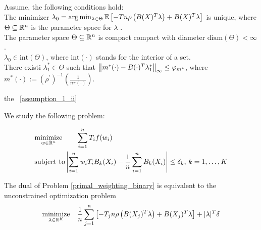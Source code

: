 \begin{asu}
  \label{assumption_1}
  Assume, the following conditions hold:
  \\
  \subasu 
  \label{assumption_1_i} 
  The minimizer 
  $
  \lambda_0 
  =
  \arg \min_{\lambda \in \Theta}
  \mathbb{E}
  \left[ 
    -T n 
    \rho 
    \left( 
    B(X)^T \lambda
    \right)
    +
    B(X)^T \lambda
  \right]
  $
  is unique,
  where 
  $\Theta \subseteq \mathbb{R}^n$ is the parameter space for $\lambda$
  .
  \\
  \subasu 
  \label{assumption_1_ii} 
  The parameter space 
  $\Theta \subseteq \mathbb{R}^n$
  is compact compact with diameter
  $\text{diam}(\Theta) < \infty$
  .
  \\
  \subasu 
  \label{assumption_1_iii}
  $\lambda_0 \in \text{int}(\Theta)$,
  where
  $\text{int}(\cdot)$
  stands for the interior of a set.
  \\
  \subasu
  \label{assumption_1_iv}
  There existi
  $\lambda^*_1 \in \Theta$
  such that
  $
  \left\lVert
    m^*(\cdot)
    -
    B(\cdot)^T \lambda^*_1
  \right\rVert_\infty
  \le 
  \varphi_{m^*}
  $,
  where
  $
  m^*(\cdot)
  :=
  \left( \rho^{'} \right)^{-1}
  \left( 
  \frac{1}{n \pi(\cdot)}
  \right)  
  .
  $
\end{asu}


the ~\ref{assumption_1_ii}

We study the following problem:

\begin{align}
  \label{primal_weighting_binary}
  \begin{split}
  &\underset{w \in \mathbb{R}^n}{\text{minimize}}
  \qquad
  \sum_{i = 1}^{n} T_i f(w_i)
  \\
  &\text{subject to}
  \left| 
    \sum_{i = 1}^{n} w_i T_i B_k(X_i)
    - 
    \frac{1}{n} \sum_{i = 1}^{n} B_k(X_i)
  \right|
  \le 
  \delta_k,\,
  k = 1, \ldots, K
  \end{split}
\end{align}


\begin{proposition}
  \label{ch_1_dual}
  The dual of Problem \eqref{primal_weighting_binary} is equivalent to the unconstrained optimization problem
  \begin{gather}
    \label{dual_weighting_binary}
      \underset{\lambda \in \mathbb{R}^K}{\text{minimize}}
      \quad
      \frac{1}{n}
      \sum_{j = 1}^{n} 
      \left[ 
        -T_j n 
        \rho 
        \left( 
          B(X_j)^T \lambda
        \right)
      +
      B(X_j)^T \lambda
      \right]
      +
      |\lambda|^T \delta
  \end{gather}
\end{proposition}


